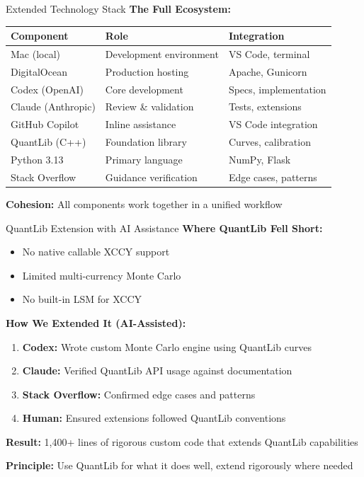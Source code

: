 \documentclass[aspectratio=169,11pt]{beamer}
\begin{document}
\begin{frame}{Extended Technology Stack}
\textbf{The Full Ecosystem:}

\begin{table}
\centering
\small
\begin{tabular}{lll}
\toprule
\textbf{Component} & \textbf{Role} & \textbf{Integration} \\
\midrule
Mac (local) & Development environment & VS Code, terminal \\
DigitalOcean & Production hosting & Apache, Gunicorn \\
\midrule
Codex (OpenAI) & Core development & Specs, implementation \\
Claude (Anthropic) & Review \& validation & Tests, extensions \\
GitHub Copilot & Inline assistance & VS Code integration \\
\midrule
QuantLib (C++) & Foundation library & Curves, calibration \\
Python 3.13 & Primary language & NumPy, Flask \\
Stack Overflow & Guidance verification & Edge cases, patterns \\
\bottomrule
\end{tabular}
\end{table}

\textbf{Cohesion:} All components work together in a unified workflow
\end{frame}

\begin{frame}{QuantLib Extension with AI Assistance}
\textbf{Where QuantLib Fell Short:}
\begin{itemize}
    \item No native callable XCCY support
    \item Limited multi-currency Monte Carlo
    \item No built-in LSM for XCCY
\end{itemize}

\textbf{How We Extended It (AI-Assisted):}
\begin{enumerate}
    \item \textbf{Codex:} Wrote custom Monte Carlo engine using QuantLib curves
    \item \textbf{Claude:} Verified QuantLib API usage against documentation
    \item \textbf{Stack Overflow:} Confirmed edge cases and patterns
    \item \textbf{Human:} Ensured extensions followed QuantLib conventions
\end{enumerate}

\textbf{Result:} 1,400+ lines of rigorous custom code that extends QuantLib capabilities

\textbf{Principle:} Use QuantLib for what it does well, extend rigorously where needed
\end{frame}
\end{document}
